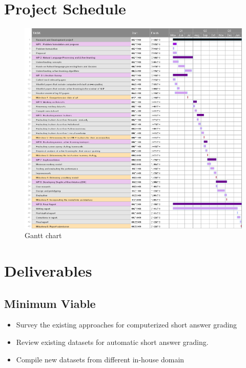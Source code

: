 \documentclass[rnd]{mas_proposal}
\begin{document}
\section{Project Schedule}




\begin{figure}[hbtp]
\caption{Gantt chart}
\centering
\includegraphics[scale=0.48]{images/gantt_chart.png}
\end{figure}

\newpage
\section{Deliverables}
\subsection{Minimum Viable}

\begin{itemize}
    \item Survey the existing approaches for computerized short answer grading
    \item Review existing datasets for automatic short answer grading.
    \item Compile new datasets from different in-house domain
\end{itemize}
\end{document}
